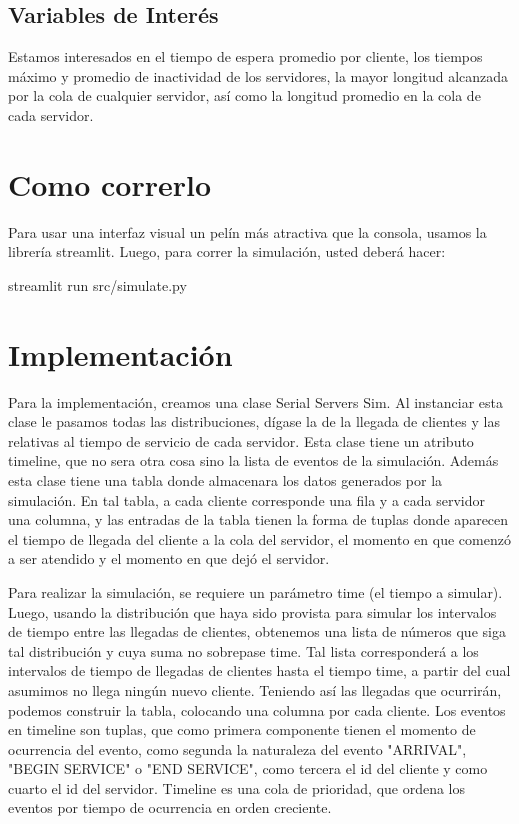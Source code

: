 \documentclass[12pt]{article}
\begin{document}
\subsection{Variables de Interés}
Estamos interesados en el tiempo de espera promedio por cliente, los tiempos máximo y promedio de inactividad de los servidores, la mayor longitud alcanzada por la cola de cualquier servidor, así como la longitud promedio en la cola de cada servidor.

\newpage
\section{Como correrlo}
Para usar una interfaz visual un pelín más atractiva que la consola, usamos la librería streamlit. Luego, para correr la simulación, usted deberá hacer:

streamlit run src/simulate.py
\newpage
\section{Implementación}
Para la implementación, creamos una clase Serial Servers Sim. Al instanciar esta clase le pasamos todas las distribuciones, dígase la de la llegada de clientes y las relativas al tiempo de servicio de cada servidor. Esta clase tiene un atributo timeline, que no sera otra cosa sino la lista de eventos de la simulación. Además esta clase tiene una tabla donde almacenara los datos generados por la simulación. En tal tabla, a cada cliente corresponde una fila y a cada servidor una columna, y las entradas de la tabla tienen la forma de tuplas donde aparecen el tiempo de llegada del cliente a la cola del servidor, el momento en que comenzó a ser atendido y el momento en que dejó el servidor.

Para realizar la simulación, se requiere un parámetro time (el tiempo a simular). Luego, usando la distribución que haya sido provista para simular los intervalos de tiempo entre las llegadas de clientes, obtenemos una lista de números que siga tal distribución y cuya suma no sobrepase time. Tal lista corresponderá a los intervalos de tiempo de llegadas de clientes hasta el tiempo time, a partir del cual asumimos no llega ningún nuevo cliente.
Teniendo así las llegadas que ocurrirán, podemos construir la tabla, colocando una columna por cada cliente.
Los eventos en timeline son tuplas, que como primera componente tienen el momento de ocurrencia del evento, como segunda la naturaleza del evento "ARRIVAL", "BEGIN SERVICE" o "END SERVICE", como tercera el id del cliente y como cuarto el id del servidor. Timeline es una cola de prioridad, que ordena los eventos por tiempo de ocurrencia en orden creciente.
\end{document}
